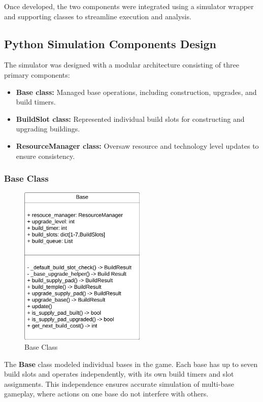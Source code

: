 \documentclass[a4paper, 12pt, english]{article}
\begin{document}
Once developed, the two components were integrated using a simulator wrapper and supporting classes to streamline execution and analysis.
\newline

\subsection{Python Simulation Components Design}
The simulator was designed with a modular architecture consisting of three primary components:
\begin{itemize}
    \item \textbf{Base class:} Managed base operations, including construction, upgrades, and build timers.
    \item \textbf{BuildSlot class:} Represented individual build slots for constructing and upgrading buildings.
    \item \textbf{ResourceManager class:} Oversaw resource and technology level updates to ensure consistency.
\end{itemize}

\subsubsection{Base Class}
\begin{figure}[!ht]
    \begin{center}
        \includegraphics[width=60mm,scale=1.0]{HaloWarsDiagramBase.png}
    \end{center}
    \caption{\label{fig:BaseClass}Base Class}
\end{figure}

The \textbf{Base} class modeled individual bases in the game. Each base has up to seven build slots and operates independently, with its own build timers and slot assignments. This independence ensures accurate simulation of multi-base gameplay, where actions on one base do not interfere with others.  
\newline
\end{document}
